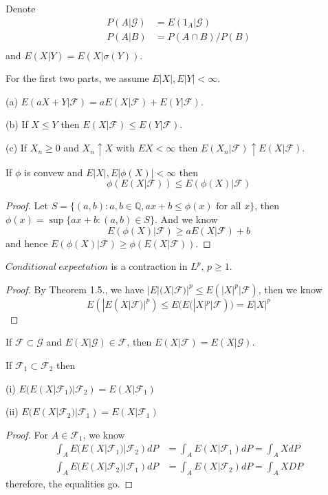 \documentclass[lang=en, color=blue, ]{elegantbook}
\newcommand{\F}{\mathcal{F}}
\newcommand{\Q}{\mathbb{Q}}
\begin{document}
\begin{definition}
Denote
\[
\begin{aligned}
P(A|\mathcal{G}) &= E(1_A|\mathcal{G}) \\
P(A|B) &= P(A\cap B)/P(B) \\
\end{aligned}
\]
and $E(X|Y) = E(X|\sigma(Y))$.
\end{definition}

\begin{theorem}
    For the first two parts, we assume $E|X|, E|Y|<\infty$.\par
    (a) $E(aX+Y|\F) = aE(X|\F)+E(Y|\F)$.\par
    (b) If $X\leq Y$ then $E(X|\F) \leq E(Y|\F)$.\par
    (c) If $X_n \geq 0$ and $X_n\uparrow X$ with $EX<\infty$ then $E(X_n|\F)\uparrow E(X|\F)$.
\end{theorem}

\begin{theorem}
    If $\phi$ is convew and $E|X|,E|\phi(X)|< \infty$ then
    \[\phi(E(X|\F)) \leq E(\phi(X)|\F)\]
\end{theorem}
\begin{proof}\par
Let $S=\{(a,b):a,b\in\Q, ax+b \leq \phi(x)\text{ for all }x\}$, then $\phi(x) = \sup\{ax+b:(a,b)\in S\}$. And we know
\[E(\phi(X)|\F)\geq aE(X|\F)+b\]
and hence $E(\phi(X)|\F) \geq \phi(E(X|\F))$.\par
\end{proof}

\begin{theorem}
    $Conditional\ expectation$ is a contraction in $L^p$, $p\geq 1$.\par
\end{theorem}
\begin{proof}\par
By Theorem 1.5., we have $|E|(X|\F)|^p \leq E(|X|^p|\F)$, then we know 
\[E(|E(X|\F)|^p) \leq E(E(|X|^p|\F)) = E|X|^p\]
\end{proof}

\begin{theorem}
    If $\F\subset\mathcal{G}$ and $E(X|\mathcal{G}) \in \F$, then $E(X|\F) = E(X|\mathcal{G})$. 
\end{theorem}

\begin{theorem}
    If $\F_1\subset\F_2$ then\par
    (i) $E(E(X|\F_1)|\F_2) = E(X|\F_1)$\par
    (ii) $E(E(X|\F_2)|\F_1) = E(X|\F_1)$\par
\end{theorem}
\begin{proof}\par
    For $A\in \F_1$, we know
    \[
    \begin{aligned}
    \int_A E(E(X|\F_1)|\F_2) dP &= \int_A E(X|\F_1) dP = \int_A X dP \\ 
    \int_A E(E(X|\F_2)|\F_1) dP &= \int_A E(X|\F_2) dP = \int_A X DP
    \end{aligned}
    \]
    therefore, the equalities go.
\end{proof}
\end{document}
